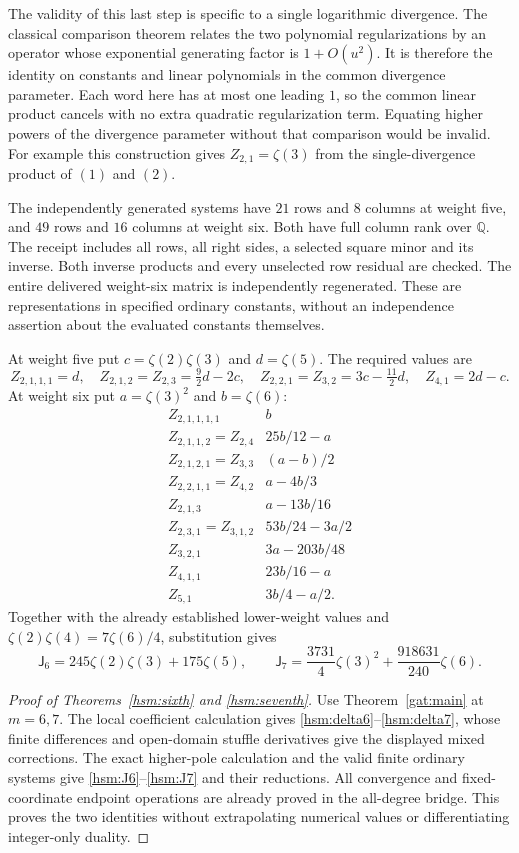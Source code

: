 The validity of this last step is specific to a single logarithmic
divergence.  The classical comparison theorem
\cite[Theorem~1, printed p.~310]{dgp:IKZ} relates the two polynomial
regularizations by an operator whose exponential generating factor
is $1+O(u^2)$.  It is therefore the identity on constants and linear
polynomials in the common divergence parameter.  Each word here has
at most one leading $1$, so the common linear product cancels with
no extra quadratic regularization term.  Equating higher powers of
the divergence parameter without that comparison would be invalid.
For example this construction gives $Z_{2,1}=\zeta(3)$ from the
single-divergence product of $(1)$ and $(2)$.

The independently generated systems have $21$ rows and $8$ columns
at weight five, and $49$ rows and $16$ columns at weight six.  Both
have full column rank over $\mathbb Q$.  The receipt includes all
rows, all right sides, a selected square minor and its inverse.
Both inverse products and every unselected row residual are checked.
The entire delivered weight-six matrix is independently regenerated.
These are representations in specified ordinary constants, without
an independence assertion about the evaluated constants themselves.

At weight five put $c=\zeta(2)\zeta(3)$ and $d=\zeta(5)$.
The required values are
\[
 Z_{2,1,1,1}=d,\quad
 Z_{2,1,2}=Z_{2,3}=\tfrac92d-2c,\quad
 Z_{2,2,1}=Z_{3,2}=3c-\tfrac{11}{2}d,\quad
 Z_{4,1}=2d-c.
\]
At weight six put $a=\zeta(3)^2$ and $b=\zeta(6)$:
\[
\begin{array}{c|l}
 Z_{2,1,1,1,1}&b\\
 Z_{2,1,1,2}=Z_{2,4}&25b/12-a\\
 Z_{2,1,2,1}=Z_{3,3}&(a-b)/2\\
 Z_{2,2,1,1}=Z_{4,2}&a-4b/3\\
 Z_{2,1,3}&a-13b/16\\
 Z_{2,3,1}=Z_{3,1,2}&53b/24-3a/2\\
 Z_{3,2,1}&3a-203b/48\\
 Z_{4,1,1}&23b/16-a\\
 Z_{5,1}&3b/4-a/2.
\end{array}
\]
Together with the already established lower-weight values and
$\zeta(2)\zeta(4)=7\zeta(6)/4$, substitution gives
\[
 \mathsf J_6=245\zeta(2)\zeta(3)+175\zeta(5),\qquad
 \mathsf J_7=\frac{3731}{4}\zeta(3)^2+\frac{918631}{240}\zeta(6).
\]

\begin{proof}[Proof of Theorems~\ref{hsm:sixth} and \ref{hsm:seventh}]
Use Theorem~\ref{gat:main} at $m=6,7$.  The local coefficient
calculation gives \eqref{hsm:delta6}--\eqref{hsm:delta7}, whose finite
differences and open-domain stuffle derivatives give the displayed
mixed corrections.  The exact higher-pole calculation and the valid
finite ordinary systems give \eqref{hsm:J6}--\eqref{hsm:J7} and their
reductions.  All convergence and fixed-coordinate endpoint operations
are already proved in the all-degree bridge.  This proves the two
identities without extrapolating numerical values or differentiating
integer-only duality.
\end{proof}

